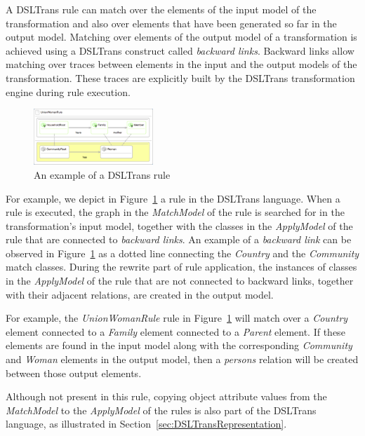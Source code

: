 A DSLTrans rule can match over the elements of the input model of the
transformation and also over elements that have been generated so far in the
output model. Matching over elements of the output model of a
transformation is achieved using a DSLTrans construct called \emph{backward
links}. Backward links allow matching over traces between elements in the input and
the output models of the transformation. These traces are explicitly built by
the DSLTrans transformation engine during rule execution.

 \begin{figure}[t]
   \begin{center}
     \includegraphics[width=0.40\textwidth]{figures/DSLTrans/UWRule.pdf}
     \caption{An example of a DSLTrans rule}
     \label{fig:DSLTrans_rule}
   \end{center}
   \vspace{-0.25in}
 \end{figure}

For example, we depict in Figure~\ref{fig:DSLTrans_rule} a
rule in the DSLTrans language.
When a rule is executed, the graph in the \emph{MatchModel} of the rule is searched for in the transformation's input model, together with the classes in the \emph{ApplyModel} of the rule that are connected to \emph{backward
links}. An example of a \emph{backward link} can be observed in
Figure~\ref{fig:DSLTrans_rule} as a dotted line connecting the \emph{Country} and the
\emph{Community} match classes. During the rewrite part of rule application,
the instances of classes in the \emph{ApplyModel} of the rule that are not connected to
backward links, together with their adjacent relations, are created in the
output model.

For example, the \emph{UnionWomanRule} rule in Figure~\ref{fig:DSLTrans_rule} will match over a \emph{Country} element connected to a \emph{Family} element connected to a \emph{Parent} element. If these elements are found in the input model along with the corresponding \emph{Community} and \emph{Woman} elements in the output model, then a \emph{persons} relation will be created between those output elements.

Although not present in this rule,
copying object attribute values from the \emph{MatchModel} to the \emph{ApplyModel} of the rules is
also part of the DSLTrans language, as illustrated in Section~\ref{sec:DSLTransRepresentation}.

